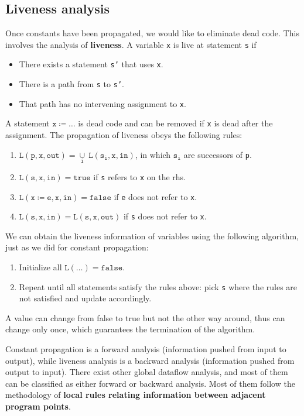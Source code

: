 \subsection{Liveness analysis}
Once constants have been propagated, we would like to eliminate dead code. This involves the analysis of \textbf{liveness}. A variable \texttt{x} is live at statement \texttt{s} if 
\begin{itemize}
\item There exists a statement \texttt{s'} that uses \texttt{x}.
\item There is a path from \texttt{s} to \texttt{s'}.
\item That path has no intervening assignment to \texttt{x}.
\end{itemize}
A statement $\mathtt{x\coloneqq \dots}$ is dead code and can be removed if \texttt{x} is dead after the assignment. The propagation of liveness obeys the following rules:
\begin{enumerate}
\item $\mathtt{L(p,x,out) = \underset{i}{\cup}\:L(s_i,x,in)}$, in which $\mathtt{s_i}$ are successors of \texttt{p}.
\item $\mathtt{L(s,x,in)=true}$ if \texttt{s} refers to \texttt{x} on the rhs.
\item $\mathtt{L(x\coloneqq e,x,in)=false}$ if \texttt{e} does not refer to \texttt{x}.
\item $\mathtt{L(s,x,in)=L(s,x,out)}$ if \texttt{s} does not refer to \texttt{x}.
\end{enumerate}
We can obtain the liveness information of variables using the following algorithm, just as we did for constant propagation:
\begin{enumerate}
\item Initialize all $\mathtt{L(\dots)=false}$.
\item Repeat until all statements satisfy the rules above: pick \texttt{s} where the rules are not satisfied and update accordingly.
\end{enumerate}
A value can change from false to true but not the other way around, thus can change only once, which guarantees the termination of the algorithm.

Constant propagation is a forward analysis (information pushed from input to output), while liveness analysis is a backward analysis (information pushed from output to input). There exist other global dataflow analysis, and most of them can be classified as either forward or backward analysis. Most of them follow the methodology of \textbf{local rules relating information between adjacent program points}. 
